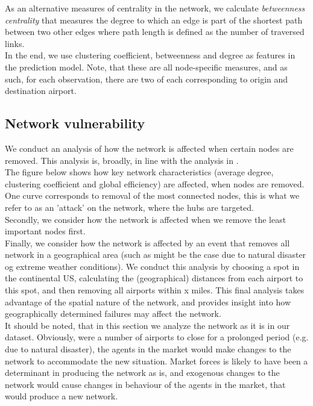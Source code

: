 As an alternative measures of centrality in the network, we calculate \textit{betweenness centrality} that measures the degree to which an edge is part of the shortest path between two other edges where path length is defined as the number of traversed links. \\
In the end, we use clustering coefficient, betweenness and degree as features in the prediction model. Note, that these are all node-specific measures, and as such, for each observation, there are two of each corresponding to origin and destination airport. 


\subsection{Network vulnerability}
We conduct an analysis of how the network is affected when certain nodes are removed. This analysis is, broadly, in line with the analysis in \cite{chi2004structural}. \\
The figure below shows how key network characteristics (average degree, clustering coefficient and global efficiency) are affected, when nodes are removed. One curve corresponds to removal of the most connected nodes, this is what we refer to as an 'attack' on the network, where the hubs are targeted. \\
Secondly, we consider how the network is affected when we remove the least important nodes first. \\
Finally, we consider how the network is affected by an event that removes all network in a geographical area (such as might be the case due to natural disaster og extreme weather conditions). We conduct this analysis by choosing a spot in the continental US, calculating the (geographical) distances from each airport to this spot, and then removing all airports within x miles. This final analysis takes advantage of the spatial nature of the network, and provides insight into how geographically determined failures may affect the network. \\
It should be noted, that in this section we analyze the network as it is in our dataset. Obviously, were a number of airports to close for a prolonged period (e.g. due to natural disaster), the agents in the market would make changes to the network to accommodate the new situation. Market forces is likely to have been a determinant in producing the network as is, and exogenous changes to the network would cause changes in behaviour of the agents in the market, that would produce a new network. \\ 

